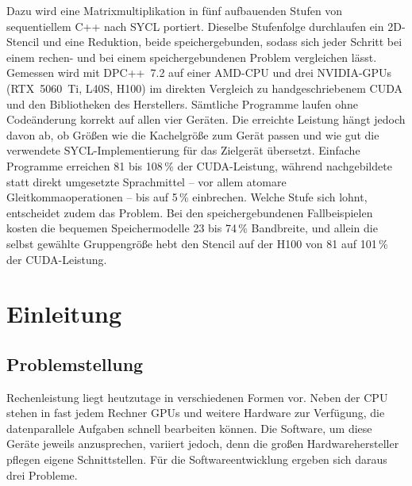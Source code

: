 \documentclass[12pt,a4paper]{article}
\begin{document}
Dazu wird eine Matrixmultiplikation in fünf aufbauenden Stufen von sequentiellem C++ nach SYCL portiert. Dieselbe Stufenfolge durchlaufen ein 2D-Stencil und eine Reduktion, beide speichergebunden, sodass sich jeder Schritt bei einem rechen- und bei einem speichergebundenen Problem vergleichen lässt. Gemessen wird mit DPC++~7.2 auf einer AMD-CPU und drei NVIDIA-GPUs (RTX~5060~Ti, L40S, H100) im direkten Vergleich zu handgeschriebenem CUDA und den Bibliotheken des Herstellers. Sämtliche Programme laufen ohne Codeänderung korrekt auf allen vier Geräten. Die erreichte Leistung hängt jedoch davon ab, ob Größen wie die Kachelgröße zum Gerät passen und wie gut die verwendete SYCL-Implementierung für das Zielgerät übersetzt. Einfache Programme erreichen 81 bis 108\,\% der CUDA-Leistung, während nachgebildete statt direkt umgesetzte Sprachmittel -- vor allem atomare Gleitkommaoperationen -- bis auf 5\,\% einbrechen. Welche Stufe sich lohnt, entscheidet zudem das Problem. Bei den speichergebundenen Fallbeispielen kosten die bequemen Speichermodelle 23 bis 74\,\% Bandbreite, und allein die selbst gewählte Gruppengröße hebt den Stencil auf der H100 von 81 auf 101\,\% der CUDA-Leistung.

\newpage
{}
\tableofcontents
\newpage
\listoffigures
\listoftables
{}
\newpage


\section{Einleitung}\label{sec:einleitung}

\subsection{Problemstellung}\label{sec:problem}

Rechenleistung liegt heutzutage in verschiedenen Formen vor. Neben der CPU
stehen in fast jedem Rechner GPUs und weitere Hardware zur Verfügung, die
datenparallele Aufgaben schnell bearbeiten können. Die Software, um diese
Geräte jeweils anzusprechen, variiert jedoch, denn die großen Hardwarehersteller
pflegen eigene Schnittstellen. Für die Softwareentwicklung ergeben sich daraus
drei Probleme.
\end{document}
